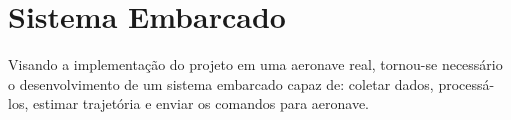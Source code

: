 






\chapter{Sistema Embarcado}

Visando a implementação do projeto em uma aeronave real, tornou-se necessário o desenvolvimento de um sistema embarcado capaz de: coletar dados, processá-los, estimar trajetória e enviar os comandos para aeronave.

